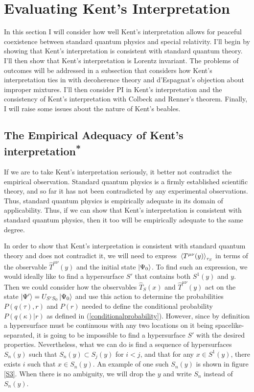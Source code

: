 \section{Evaluating Kent's Interpretation}
In this section I will consider how well Kent's interpretation allows for peaceful coexistence between standard quantum physics and special relativity. I'll begin by showing that Kent's interpretation is consistent with standard quantum theory. I'll then show that Kent's interpretation is Lorentz invariant. The problems of outcomes will be addressed in a subsection that considers how Kent's interpretation ties in with decoherence theory and d'Espagnat's objection about improper mixtures. I'll then consider PI in Kent's interpretation and the consistency of Kent's interpretation with Colbeck and Renner's theorem. Finally, I will raise some issues about the nature of Kent's beables.

\subsection{The Empirical Adequacy of Kent's interpretation\textsuperscript{*}}
\renewcommand{\thefootnote}{\fnsymbol{footnote}}
\label{LorentzInvarianceSection}
\renewcommand*{\thefootnote}{\arabic{footnote}}
If we are to take Kent's interpretation seriously, it better not contradict the empirical observation. Standard quantum physics is a firmly established scientific theory, and so far it has not been contradicted by any experimental observations. Thus, standard quantum physics is empirically adequate in its domain of applicability.
Thus, if we can show that Kent's interpretation is consistent with standard quantum physics, then it too will be empirically adequate to the same degree.  

In order to show that Kent's interpretation is consistent with standard quantum theory  and  does not contradict it, we will need to express $\ev*{T^{\mu\nu}(y)}_{\tau_S}$ in terms of the observable $\hat{T}^{\mu\nu}(y)$ and the initial state $\ket{\Psi_0}$. To find such an expression, we would ideally like to find a hypersurface $S'$ that contains both $S^1(y)$ and $y$. Then we could consider how the observables $\hat{T}_S(x)$ and $\hat{T}^{\mu\nu}(y)$ act on the state $\ket{\Psi'}=U_{S'S_0}\ket{\Psi_0}$ and use this action to determine the probabilities $P(q(\tau),r)$ and $P(r)$ needed to define the conditional probability $P(q(\kappa)|r)$ as defined in (\ref{conditionalprobability}). However, since by definition a hypersurface must be continuous with any two locations on it being spacelike-separated, it is going to be impossible to find a hypersurface $S'$ with the desired properties. Nevertheless, what we can do is find a sequence of hypersurfaces $S_n(y)$ such that\label{siydef} $S_n(y)\subset S_j(y)$ for $i<j$, and that for any $x\in S^1(y)$, there exists $i$ such that $x\in S_n(y)$. An example of one such $S_n(y)$ is shown in figure \ref{S3}. When there is no ambiguity, we will drop the $y$ and write $S_n$ instead of $S_n(y)$. 


